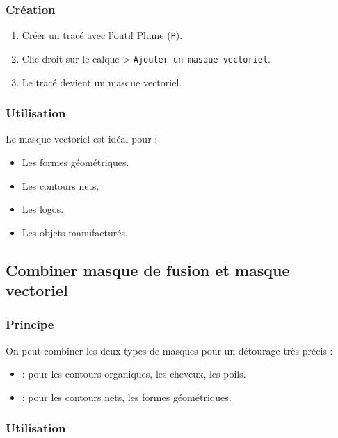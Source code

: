 \subsubsection{Création}

\begin{enumerate}
    \item Créer un tracé avec l'outil Plume (\texttt{P}).
    \item Clic droit sur le calque > \texttt{Ajouter un masque vectoriel}.
    \item Le tracé devient un masque vectoriel.
\end{enumerate}

\subsubsection{Utilisation}

Le masque vectoriel est idéal pour :

\begin{itemize}
    \item Les formes géométriques.
    \item Les contours nets.
    \item Les logos.
    \item Les objets manufacturés.
\end{itemize}

\subsection{Combiner masque de fusion et masque vectoriel}

\subsubsection{Principe}

On peut combiner les deux types de masques pour un détourage très précis :

\begin{itemize}
    \item {} : pour les contours organiques, les cheveux, les poils.
    \item {} : pour les contours nets, les formes géométriques.
\end{itemize}

\subsubsection{Utilisation}

